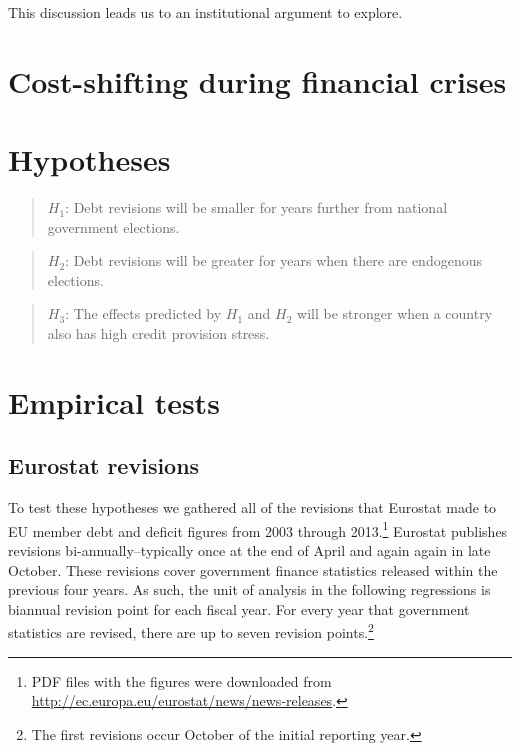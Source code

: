 \documentclass[]{article}
\begin{document}
This discussion leads us to an institutional argument to explore. 

\cite{DeCastro2013} \cite{Alt2014}

\section{Cost-shifting during financial crises}

\cite{GandrudHallerberg2016}

\section{Hypotheses}

\begin{quote}
    $H_{1}$: Debt revisions will be smaller for years further from national government elections.
\end{quote}

\begin{quote}
    $H_{2}$: Debt revisions will be greater for years when there are endogenous elections.
\end{quote}

\begin{quote}
    $H_{3}$: The effects predicted by $H_{1}$ and $H_{2}$ will be stronger when a country also has high credit provision stress.
\end{quote}

\section{Empirical tests}

\subsection{Eurostat revisions}

To test these hypotheses we gathered all of the revisions that Eurostat made to EU member debt and deficit figures from 2003 through 2013.\footnote{PDF files with the figures were downloaded from \url{http://ec.europa.eu/eurostat/news/news-releases}.} Eurostat publishes revisions bi-annually--typically once at the end of April and again again in late October. These revisions cover government finance statistics released within the previous four years. As such, the unit of analysis in the following regressions is biannual revision point for each fiscal year. For every year that government statistics are revised, there are up to seven revision points.\footnote{The first revisions occur October of the initial reporting year.}
\end{document}
